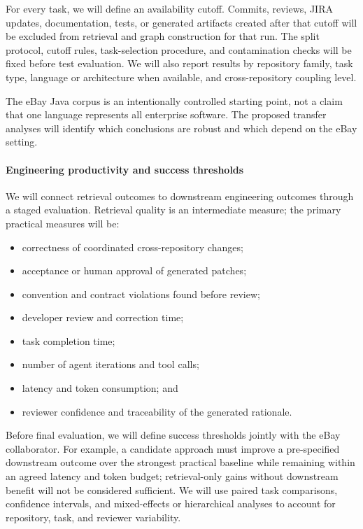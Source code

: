 \documentclass[11pt]{article}
\begin{document}
For every task, we will define an availability cutoff. Commits, reviews, JIRA updates, documentation, tests, or generated artifacts created after that cutoff will be excluded from retrieval and graph construction for that run. The split protocol, cutoff rules, task-selection procedure, and contamination checks will be fixed before test evaluation. We will also report results by repository family, task type, language or architecture when available, and cross-repository coupling level.

The eBay Java corpus is an intentionally controlled starting point, not a claim that one language represents all enterprise software. The proposed transfer analyses will identify which conclusions are robust and which depend on the eBay setting.

\paragraph{Engineering productivity and success thresholds}
We will connect retrieval outcomes to downstream engineering outcomes through a staged evaluation. Retrieval quality is an intermediate measure; the primary practical measures will be:

\begin{itemize}
  \item correctness of coordinated cross-repository changes;
  \item acceptance or human approval of generated patches;
  \item convention and contract violations found before review;
  \item developer review and correction time;
  \item task completion time;
  \item number of agent iterations and tool calls;
  \item latency and token consumption; and
  \item reviewer confidence and traceability of the generated rationale.
\end{itemize}

Before final evaluation, we will define success thresholds jointly with the eBay collaborator. For example, a candidate approach must improve a pre-specified downstream outcome over the strongest practical baseline while remaining within an agreed latency and token budget; retrieval-only gains without downstream benefit will not be considered sufficient. We will use paired task comparisons, confidence intervals, and mixed-effects or hierarchical analyses to account for repository, task, and reviewer variability.
\end{document}
